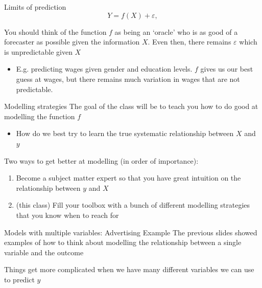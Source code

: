\documentclass[aspectratio=169,t,11pt,table]{beamer}
\begin{document}
\begin{frame}{Limits of prediction}
  $$
    Y = f(X) + \varepsilon,
  $$

  You should think of the function $f$ as being an `oracle' who is as good of a forecaster as possible given the information $X$. 
  Even then, there remains $\varepsilon$ which is unpredictable given $X$
  \begin{itemize}
    \item E.g. predicting wages given gender and education levels. 
    $f$ gives us our best guess at wages, but there remains much variation in wages that are not predictable.
  \end{itemize}
\end{frame}

\begin{frame}{Modelling strategies}
  The goal of the class will be to teach you how to do good at \alert{modelling} the function $f$
  \begin{itemize}
    \item How do we best try to learn the true systematic relationship between $X$ and $y$
  \end{itemize}

  \bigskip
  Two ways to get better at modelling (in order of importance):
  \begin{enumerate}
    \item Become a subject matter expert so that you have great intuition on the relationship between $y$ and $X$
    
    \item (this class) Fill your toolbox with a bunch of different modelling strategies that you know when to reach for
  \end{enumerate}
\end{frame}


\begin{frame}{Models with multiple variables: Advertising Example}
  The previous slides showed examples of how to think about modelling the relationship between a single variable and the outcome
  
  \bigskip
  Things get more complicated when we have many different variables we can use to predict $y$
\end{frame}
\end{document}
